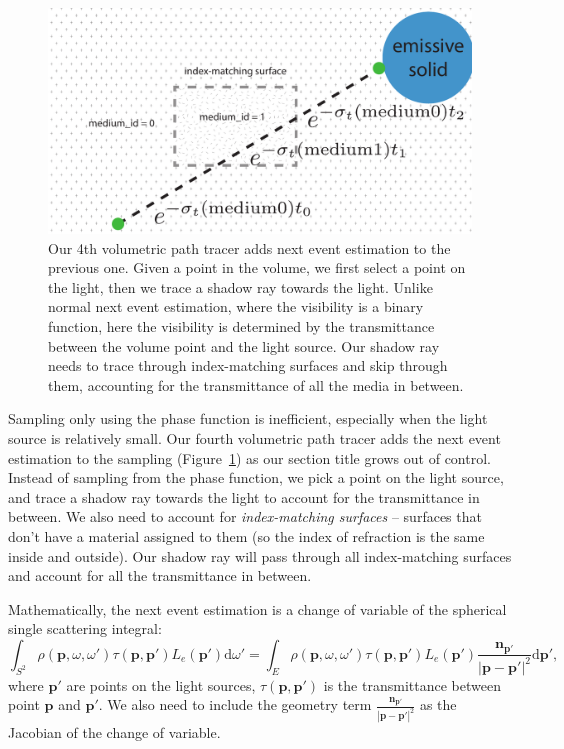 \begin{figure}
\includegraphics[width=\linewidth]{imgs/volume_next_event_estimation.pdf}
\caption{Our 4th volumetric path tracer adds next event estimation to the previous one. Given a point in the volume, we first select a point on the light, then we trace a shadow ray towards the light. Unlike normal next event estimation, where the visibility is a binary function, here the visibility is determined by the transmittance between the volume point and the light source. Our shadow ray needs to trace through index-matching surfaces and skip through them, accounting for the transmittance of all the media in between.}
\label{fig:volpath4_illustration}
\end{figure}

Sampling only using the phase function is inefficient, especially when the light source is relatively small. Our fourth volumetric path tracer adds the next event estimation to the sampling (Figure~\ref{fig:volpath4_illustration}) as our section title grows out of control. Instead of sampling from the phase function, we pick a point on the light source, and trace a shadow ray towards the light to account for the transmittance in between. We also need to account for \emph{index-matching surfaces} -- surfaces that don't have a material assigned to them (so the index of refraction is the same inside and outside). Our shadow ray will pass through all index-matching surfaces and account for all the transmittance in between.

Mathematically, the next event estimation is a change of variable of the spherical single scattering integral:
\begin{equation}
\int_{S^2} \rho(\mathbf{p}, \omega, \omega') \tau(\mathbf{p}, \mathbf{p}') L_e(\mathbf{p}') \mathrm{d} \omega' =
\int_{E} \rho(\mathbf{p}, \omega, \omega') \tau(\mathbf{p}, \mathbf{p}') L_e(\mathbf{p}') \frac{\mathbf{n}_{\mathbf{p}'}}{\left|\mathbf{p} - \mathbf{p}'\right|^2} \mathrm{d} \mathbf{p}',
\end{equation}
where $\mathbf{p}'$ are points on the light sources, $\tau(\mathbf{p}, \mathbf{p}')$ is the transmittance between point $\mathbf{p}$ and $\mathbf{p}'$. We also need to include the geometry term $\frac{\mathbf{n}_{\mathbf{p}'}}{\left|\mathbf{p} - \mathbf{p}'\right|^2}$ as the Jacobian of the change of variable.

